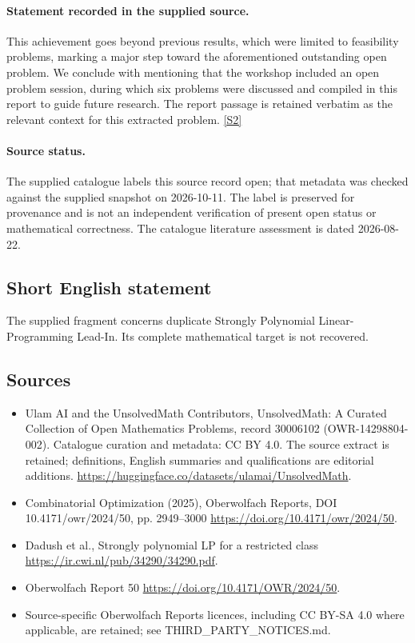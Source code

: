 \documentclass[11pt]{article}
\newcommand{\sref}[2]{\hyperlink{source:#1:#2}{[S#2]}}
\begin{document}
\paragraph{Statement recorded in the supplied source.}
This achievement goes beyond previous results, which were limited to feasibility problems, marking a major step toward the aforementioned outstanding open problem. We conclude with mentioning that the workshop included an open problem session, during which six problems were discussed and compiled in this report to guide future research. The report passage is retained verbatim as the relevant context for this extracted problem. \sref{30006102}{2}
\paragraph{Source status.}
The supplied catalogue labels this source record open; that metadata was checked against the supplied snapshot on 2026-10-11. The label is preserved for provenance and is not an independent verification of present open status or mathematical correctness. The catalogue literature assessment is dated 2026-08-22.
\subsection{Short English statement}
The supplied fragment concerns duplicate Strongly Polynomial Linear-Programming Lead-In. Its complete mathematical target is not recovered.
\subsection{Sources}
\begin{itemize}
\item[\hypertarget{source:30006102:1}{S1}] Ulam AI and the UnsolvedMath Contributors, UnsolvedMath: A Curated Collection of Open Mathematics Problems, record 30006102 (OWR-14298804-002). Catalogue curation and metadata: CC BY 4.0. The source extract is retained; definitions, English summaries and qualifications are editorial additions.
\url{https://huggingface.co/datasets/ulamai/UnsolvedMath}.
\item[\hypertarget{source:30006102:2}{S2}] Combinatorial Optimization (2025), Oberwolfach Reports, DOI 10.4171/owr/2024/50, pp. 2949--3000
\url{https://doi.org/10.4171/owr/2024/50}.
\item[\hypertarget{source:30006102:3}{S3}] Dadush et al., Strongly polynomial LP for a restricted class
\url{https://ir.cwi.nl/pub/34290/34290.pdf}.
\item[\hypertarget{source:30006102:4}{S4}] Oberwolfach Report 50
\url{https://doi.org/10.4171/OWR/2024/50}.
\item Source-specific Oberwolfach Reports licences, including CC BY-SA 4.0 where applicable, are retained; see THIRD\_PARTY\_NOTICES.md.
\end{itemize}
\end{document}

